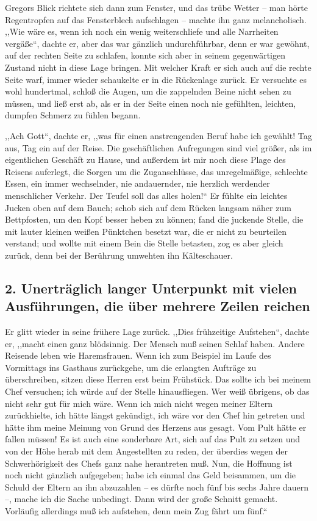 \documentclass[]{zchinr}
\begin{document}
Gregors Blick richtete sich dann zum Fenster, und das trübe Wetter -- man hörte Regentropfen auf das Fensterblech aufschlagen -- machte ihn ganz melancholisch. ,,Wie wäre es, wenn ich noch ein wenig weiterschliefe und alle Narrheiten vergäße``, dachte er, aber das war gänzlich undurchführbar, denn er war gewöhnt, auf der rechten Seite zu schlafen, konnte sich aber in seinem gegenwärtigen Zustand nicht in diese Lage bringen. Mit welcher Kraft er sich auch auf die rechte Seite warf, immer wieder schaukelte er in die Rückenlage zurück. Er versuchte es wohl hundertmal, schloß die Augen, um die zappelnden Beine nicht sehen zu müssen, und ließ erst ab, als er in der Seite einen noch nie gefühlten, leichten, dumpfen Schmerz zu fühlen begann.

,,Ach Gott``, dachte er, ,,was für einen anstrengenden Beruf habe ich gewählt! Tag aus, Tag ein auf der Reise. Die geschäftlichen Aufregungen sind viel größer, als im eigentlichen Geschäft zu Hause, und außerdem ist mir noch diese Plage des Reisens auferlegt, die Sorgen um die Zuganschlüsse, das unregelmäßige, schlechte Essen, ein immer wechselnder, nie andauernder, nie herzlich werdender menschlicher Verkehr. Der Teufel soll das alles holen!`` Er fühlte ein leichtes Jucken oben auf dem Bauch; schob sich auf dem Rücken langsam näher zum Bettpfosten, um den Kopf besser heben zu können; fand die juckende Stelle, die mit lauter kleinen weißen Pünktchen besetzt war, die er nicht zu beurteilen verstand; und wollte mit einem Bein die Stelle betasten, zog es aber gleich zurück, denn bei der Berührung umwehten ihn Kälteschauer.

\subsection{2. Unerträglich langer Unterpunkt mit vielen Ausführungen, die über mehrere Zeilen reichen}

Er glitt wieder in seine frühere Lage zurück. ,,Dies frühzeitige Aufstehen``, dachte er, ,,macht einen ganz blödsinnig. Der Mensch muß seinen Schlaf haben. Andere Reisende leben wie Haremsfrauen. Wenn ich zum Beispiel im Laufe des Vormittags ins Gasthaus zurückgehe, um die erlangten Aufträge zu überschreiben, sitzen diese Herren erst beim Frühstück. Das sollte ich bei meinem Chef versuchen; ich würde auf der Stelle hinausfliegen. Wer weiß übrigens, ob das nicht sehr gut für mich wäre. Wenn ich mich nicht wegen meiner Eltern zurückhielte, ich hätte längst gekündigt, ich wäre vor den Chef hin getreten und hätte ihm meine Meinung von Grund des Herzens aus gesagt. Vom Pult hätte er fallen müssen! Es ist auch eine sonderbare Art, sich auf das Pult zu setzen und von der Höhe herab mit dem Angestellten zu reden, der überdies wegen der Schwerhörigkeit des Chefs ganz nahe herantreten muß. Nun, die Hoffnung ist noch nicht gänzlich aufgegeben; habe ich einmal das Geld beisammen, um die Schuld der Eltern an ihn abzuzahlen -- es dürfte noch fünf bis sechs Jahre dauern --, mache ich die Sache unbedingt. Dann wird der große Schnitt gemacht. Vorläufig allerdings muß ich aufstehen, denn mein Zug fährt um fünf.``
\end{document}
